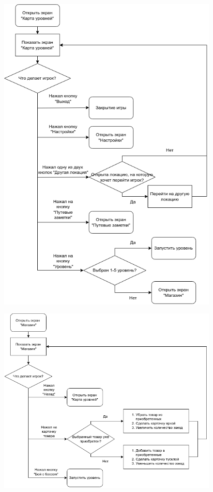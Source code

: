 \documentclass{article}
\begin{document}
\begin{figure}[H]
    \includegraphics[scale=0.8]{pictures/2.png}
\end{figure}

\begin{figure}[H]
    \includegraphics[scale=0.8]{pictures/3.png}
\end{figure}
\end{document}
